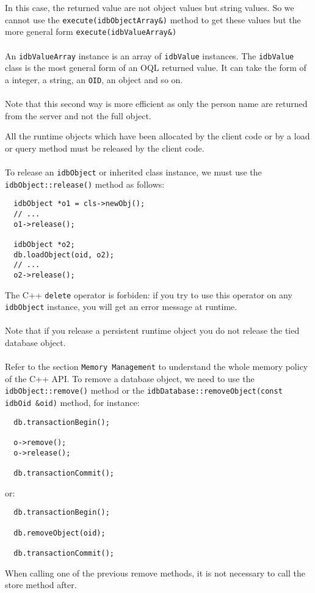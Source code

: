 \normalsize
In this case, the returned value are not object values but string values.
So we cannot use the \texttt{execute(idbObjectArray\&)} method to get
these values but the more general form \texttt{execute(idbValueArray\&)}
\\
\\
An \texttt{idbValueArray} instance is an array of \texttt{idbValue} instances.
The \texttt{idbValue} class is the most general form of an OQL returned value.
It can take the form of a integer, a string, an \texttt{OID}, an object and
so on.
\\
\\
Note that this second way is more efficient as only the person
name are returned from the server and not the full object.
\ee

All the runtime objects which have been allocated by the client code
or by a load or query method must be released by the client code.
\\
\\
To release an \texttt{idbObject} or inherited class instance, we must use
the \texttt{idbObject::release()} method as follows:
\verbsize
\begin{verbatim}
  idbObject *o1 = cls->newObj();
  // ...
  o1->release();

  idbObject *o2;
  db.loadObject(oid, o2);
  // ...
  o2->release();
\end{verbatim}
\normalsize
The C++ \texttt{delete} operator is forbiden: if you try to use this operator
on any \texttt{idbObject} instance, you will get an error message at runtime.
\\
\\
Note that if you release a persistent runtime object you do not release
the tied database object.
\\
\\
Refer to the section \texttt{Memory Management} to understand the whole
memory policy of the C++ API.
To remove a database object, we need to use the
\texttt{idbObject::remove()} method or the \texttt{idbDatabase::removeObject(const idbOid \&oid)} method, for instance:
\verbsize
\begin{verbatim}
  db.transactionBegin();

  o->remove();
  o->release();

  db.transactionCommit();
\end{verbatim}
\normalsize
or:
\verbsize
\begin{verbatim}
  db.transactionBegin();

  db.removeObject(oid);

  db.transactionCommit();
\end{verbatim}
\normalsize
When calling one of the previous remove methods, it is not necessary
to call the store method after.

